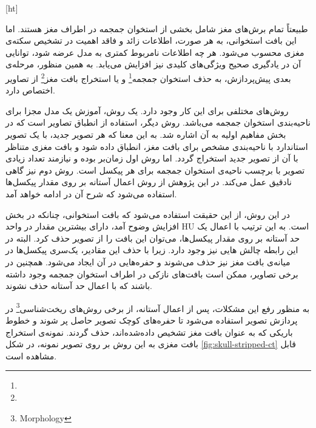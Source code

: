 
[ht]


طبیعتاً تمام برش‌های مغز شامل بخشی از استخوان جمجمه در اطراف مغز هستند.
اما این بافت استخوانی، به هر صورت، اطلاعات زائد و فاقد اهمیت در تشخیص سکته‌ی مغزی محسوب می‌شود.
هر چه اطلاعات نامربوط کمتری به مدل عرضه شود، توانایی آن در یادگیری صحیح ویژگی‌های کلیدی نیز افزایش می‌یابد.
به همین منظور، مرحله‌ی بعدی پیش‌پردازش، به 
حذف استخوان جمجمه\footnote{}
و یا 
استخراج بافت مغز\footnote{}
از تصاویر اختصاص دارد.

روش‌های مختلفی برای این کار وجود دارد.
یک روش، آموزش یک مدل مجزا برای ناحیه‌بندی استخوان جمجمه می‌باشد.
روش دیگر، استفاده از انطباق تصاویر است که در بخش مفاهیم اولیه به آن اشاره شد.
به این معنا که هر تصویر جدید، با یک تصویر استاندارد با ناحیه‌بندی مشخص برای بافت مغز، انطباق داده شود و بافت مغزی متناظر با آن از تصویر جدید استخراج گردد.
اما روش اول زمان‌بر بوده و نیازمند تعداد زیادی تصویر با برچسب ناحیه‌ی استخوان جمجمه برای هر پیکسل است.
روش دوم نیز گاهی نادقیق عمل می‌کند.
در این پژوهش از روش اعمال آستانه بر روی مقدار پیکسل‌ها استفاده می‌شود که شرح آن در ادامه خواهد آمد.

در این روش، از این حقیقت استفاده می‌شود که بافت استخوانی، چنانکه در بخش افزایش وضوح آمد، دارای بیشترین مقدار در واحد HU است.
به این ترتیب با اعمال یک حد آستانه بر روی مقدار پیکسل‌ها، می‌‌توان این بافت را از تصویر حذف کرد.
البته در این رابطه چالش هایی نیز وجود دارد.
زیرا با حذف این مقادیر، یک‌سری پیکسل‌ها در میانه‌ی بافت مغز نیز حذف می‌شوند و حفره‌هایی در آن ایجاد می‌شود.
همچنین در برخی تصاویر، ممکن است بافت‌های نازکی در اطراف استخوان جمجمه وجود داشته باشند که با اعمال حد آستانه حذف نشوند.

به منظور رفع این مشکلات، پس از اعمال آستانه، از برخی روش‌های 
ریخت‌شناسی\footnote{Morphology}
در پردازش تصویر استفاده می‌شود تا
حفره‌های کوچک تصویر حاصل پر شوند و 
خطوط باریکی که به عنوان بافت مغز تشخیص داده‌شده‌اند، حذف گردند.
نمونه‌ی استخراج بافت مغزی به این روش بر روی تصویر نمونه، در شکل \ref{fig:skull-stripped-ct}
قابل مشاهده است.

